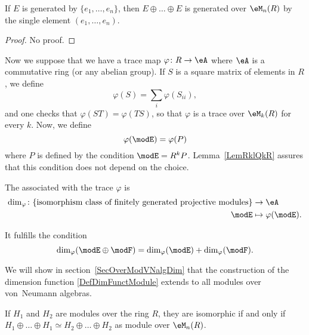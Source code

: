 \begin{lemma}		\label{LemFGenEEEsingleGen}
	If $E$ is generated by $\{ e_1,\ldots, e_n \}$, then $E\oplus\ldots\oplus E$ is generated over $\eM_n(R)$ by the single element $(e_1,\ldots,e_n)$.
\end{lemma}
\begin{proof}
	No proof.
\end{proof}


Now we suppose that we have a trace map $\varphi\colon R\to \eA$ where $\eA$ is a commutative ring (or any abelian group). If $S$ is a square matrix of elements in $R$, we define
\begin{equation}
	\varphi(S)=\sum_i\varphi(S_{ii}),
\end{equation}
and one checks that $\varphi(ST)=\varphi(TS)$, so that $\varphi$ is a trace over $\eM_k(R)$ for every $k$. Now, we define
\begin{equation}			\label{EqPreDefDimModuleRA}
	\varphi(\modE)=\varphi(P)
\end{equation}
where $P$ is defined by the condition $\modE=R^kP$. Lemma~\ref{LemRklQkR} assures that this condition does not depend on the choice.

\begin{definition}  \label{DefHDhfMGJ}
	The  associated with the trace $\varphi$ is
	\begin{equation}\label{DefDimFunctModule}
		\begin{aligned}
			\dim_{\varphi}\colon \{ \text{isomorphism class of finitely generated projective modules} \} & \to \eA                 \\
			\modE                                                                                        & \mapsto \varphi(\modE).
		\end{aligned}
	\end{equation}
\end{definition}

\begin{lemma}
	It fulfills the condition
	\begin{equation}
		\dim_{\varphi}(\modE\oplus \modF)=\dim_{\varphi}(\modE)+\dim_{\varphi}(\modF).
	\end{equation}
\end{lemma}
We will show in section~\ref{SecOverModVNalgDim} that the construction of the dimension function \eqref{DefDimFunctModule} extends to all modules over von~Neumann algebras.

\begin{lemma}
	If $H_1$ and $H_2$ are modules over the ring $R$, they are isomorphic if and only if $H_1\oplus\ldots\oplus H_1\simeq H_2\oplus\ldots\oplus H_2$ as module over $\eM_n(R)$.
\end{lemma}


